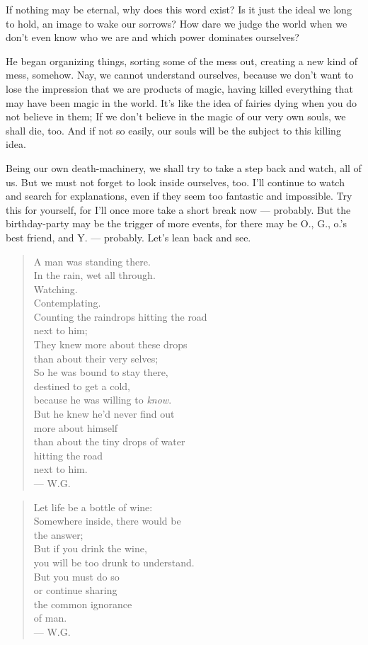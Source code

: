 If nothing may be eternal, why does this word exist? Is it just the ideal we long to hold, an image to wake our sorrows? 
How dare we judge the world when we don't even know who we are and which power dominates ourselves?

He began organizing things, sorting some of the mess out, creating a new kind of mess, somehow. Nay, we cannot understand ourselves, because we don't want to lose the impression that we are products of magic, having killed everything that may have been magic in the world. It's like the idea of fairies dying when you do not believe in them; If we don't believe in the magic of our very own souls, we shall die, too. 
And if not so easily, our souls will be the subject to this killing idea.

Being our own death-machinery, we shall try to take a step back and watch, all of us. But we must not forget to look inside ourselves, too. 
I'll continue to watch and search for explanations, even if they seem too fantastic and impossible. Try this for yourself, for I'll once more take a short break now --- probably. But the birthday-party may be the trigger of more events, for there may be O., G., o.'s best friend, and Y. --- probably. Let's lean back and see.

\begin{quote}
A man was standing there. \\
In the rain, wet all through. \\
Watching. \\
Contemplating. \\
Counting the raindrops hitting the road \\
next to him; \\
They knew more about these drops \\
than about their very selves; \\
So he was bound to stay there, \\
destined to get a cold, \\
because he was willing to \emph{know}. \\
But he knew he'd never find out \\
more about himself \\
than about the tiny drops of water \\
hitting the road \\
next to him. \\
--- W.G.
\end{quote}

\begin{quote}
Let life be a bottle of wine: \\
Somewhere inside, there would be \\
the answer; \\
But if you drink the wine, \\
you will be too drunk to understand. \\
But you must do so \\
or continue sharing \\
the common ignorance \\
of man. \\
--- W.G.
\end{quote}
